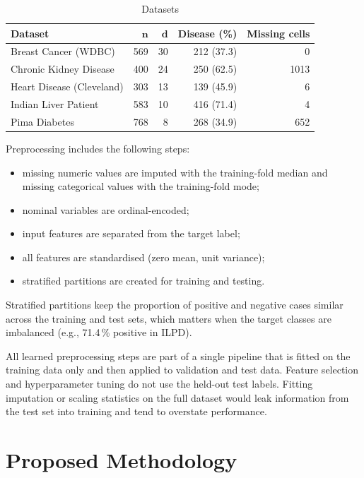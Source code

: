 \documentclass[conference]{IEEEtran}
\begin{document}
\begin{table}[!t]
\centering
\caption{Datasets}
\label{tab:datasets}
\footnotesize
\setlength{\tabcolsep}{3pt}
\begin{tabular}{lrrrr}
\toprule
\textbf{Dataset} & $\boldsymbol{n}$ & $\boldsymbol{d}$ & \textbf{Disease (\%)} & \textbf{Missing cells} \\
\midrule
Breast Cancer (WDBC) & 569 & 30 & 212 (37.3) & 0 \\
Chronic Kidney Disease & 400 & 24 & 250 (62.5) & 1013 \\
Heart Disease (Cleveland) & 303 & 13 & 139 (45.9) & 6 \\
Indian Liver Patient & 583 & 10 & 416 (71.4) & 4 \\
Pima Diabetes & 768 & 8 & 268 (34.9) & 652 \\
\bottomrule
\end{tabular}
\end{table}

Preprocessing includes the following steps:
\begin{itemize}
\item missing numeric values are imputed with the training-fold median and
missing categorical values with the training-fold mode;
\item nominal variables are ordinal-encoded;
\item input features are separated from the target label;
\item all features are standardised (zero mean, unit variance);
\item stratified partitions are created for training and testing.
\end{itemize}
Stratified partitions keep the proportion of positive and negative cases
similar across the training and test sets, which matters when the target
classes are imbalanced (e.g., 71.4\,\% positive in ILPD).

All learned preprocessing steps are part of a single pipeline that is fitted
on the training data only and then applied to validation and test data.
Feature selection and hyperparameter tuning do not use the held-out test
labels. Fitting imputation or scaling statistics on the full dataset would
leak information from the test set into training and tend to overstate
performance.

\section{Proposed Methodology}
\end{document}
